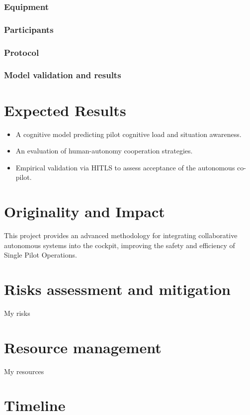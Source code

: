 \documentclass[12pt,a4paper]{article} %
\begin{document}
	\subsubsection{Equipment}
	\subsubsection{Participants}
	\subsubsection{Protocol}
	\subsubsection{Model validation and results}
	
	\section{Expected Results} %
	\begin{itemize}
		\item A cognitive model predicting pilot cognitive load and situation awareness.
		\item An evaluation of human-autonomy cooperation strategies.
		\item Empirical validation via HITLS to assess acceptance of the autonomous co-pilot.
	\end{itemize} %
	
	\section{Originality and Impact} %
	This project provides an advanced methodology for integrating collaborative autonomous systems into the cockpit, improving the safety and efficiency of Single Pilot Operations.
	
	\section{Risks assessment and mitigation}
	My risks
	
	\section{Resource management}
	My resources
	
	\section{Timeline}
	\printbibliography %
	
\end{document}
